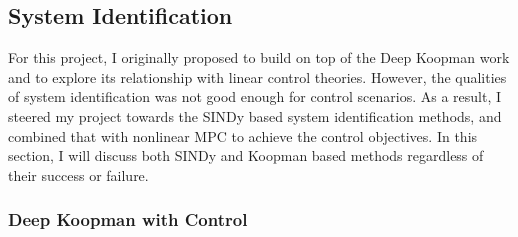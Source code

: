 \documentclass[10pt,twocolumn]{article}
\begin{document}
\subsection{System Identification}

For this project, I originally proposed to build on top of the Deep Koopman work and to
explore its relationship with linear control theories. However, the qualities of system
identification was not good enough for control scenarios. As a result, I steered
my project towards the SINDy based system identification methods, and combined that
with nonlinear MPC to achieve the control objectives. In this section, I will discuss
both SINDy and Koopman based methods regardless of their success or failure.

\subsubsection{Deep Koopman with Control}\label{sec:deep_koopman}
\end{document}

